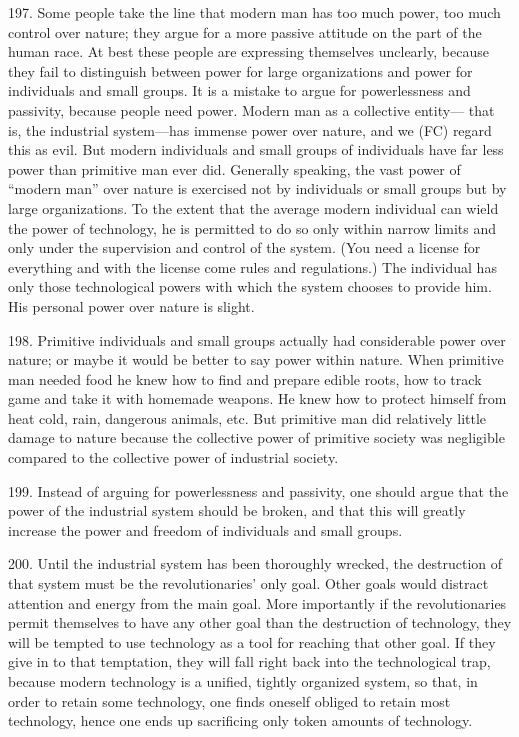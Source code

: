 \documentclass{article}
\begin{document}
197.  Some  people  take  the  line  that  modern  man  has  too  much  power,  too  much  control  over  
nature; they argue for a more passive attitude on the part of the human race.  At best these people 
are  expressing  themselves  unclearly,  because  they  fail  to  distinguish  between  power  for  large 
organizations and power for individuals and  small groups.  It is a mistake to argue for 
powerlessness  and  passivity,  because  people  need  power.   Modern  man  as  a  collective  entity—
that is, the industrial system—has immense power over nature, and we (FC) regard this as evil.  But 
modern individuals and small groups of individuals have far less power than primitive man ever 
did.   Generally  speaking,  the  vast  power  of  “modern  man”  over  nature  is  exercised  not  by  
individuals  or  small  groups  but  by  large  organizations.   To  the  extent  that  the  average  modern  
individual can wield the power of technology, he is permitted to do so only within narrow limits 
and only under the supervision and control of the system.  (You need a license for everything and 
with the license come rules and regulations.) The individual has only those technological powers 
with which the system chooses to provide him.  His personal power over nature is slight. \vspace{\baselineskip}

198.  Primitive  individuals  and  small  groups  actually  had  considerable  power  over  nature;  or
maybe it would be better to say power within nature.  When primitive man needed food he knew 
how to find and prepare edible roots, how to track game and take it with homemade weapons.  He 
knew how to protect himself from heat cold, rain, dangerous animals, etc.  But primitive man did 
relatively little damage to nature because the collective power of primitive society was negligible 
compared to the collective power of industrial society. \vspace{\baselineskip}

199.  Instead of arguing for powerlessness and passivity, one should argue that the power of the 
industrial system should be broken, and that this will greatly increase the power and freedom of 
individuals and small groups. \vspace{\baselineskip}

200.  Until the industrial system has been thoroughly wrecked, the destruction of that system must 
be the revolutionaries’ only goal.  Other goals would distract attention and energy from the main 
goal.  More importantly if the revolutionaries permit themselves to have any other goal than the 
destruction of technology, they will be tempted to use technology as a tool for reaching that other 
goal.  If they give in to that temptation, they will fall right back into the technological trap, because 
modern  technology  is  a  unified,  tightly  organized  system,  so  that,  in  order  to  retain  some 
technology,  one  finds  oneself  obliged  to  retain  most  technology,  hence  one  ends  up  sacrificing  
only token amounts of technology. \vspace{\baselineskip}
\end{document}
